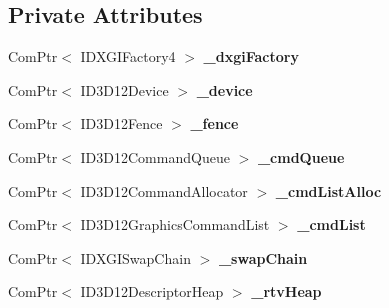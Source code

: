 \subsection*{Private Attributes}
\begin{DoxyCompactItemize}
\item 
Com\+Ptr$<$ I\+D\+X\+G\+I\+Factory4 $>$ {\bfseries \+\_\+dxgi\+Factory}\hypertarget{class_ensum_1_1_graphics_1_1_direct3_d12_a8805759c5176e916d4879643c03493f4}{}\label{class_ensum_1_1_graphics_1_1_direct3_d12_a8805759c5176e916d4879643c03493f4}

\item 
Com\+Ptr$<$ I\+D3\+D12\+Device $>$ {\bfseries \+\_\+device}\hypertarget{class_ensum_1_1_graphics_1_1_direct3_d12_a8e10faf109b0db839652413b7a826899}{}\label{class_ensum_1_1_graphics_1_1_direct3_d12_a8e10faf109b0db839652413b7a826899}

\item 
Com\+Ptr$<$ I\+D3\+D12\+Fence $>$ {\bfseries \+\_\+fence}\hypertarget{class_ensum_1_1_graphics_1_1_direct3_d12_aa0662a390b2af9df9a59123843931180}{}\label{class_ensum_1_1_graphics_1_1_direct3_d12_aa0662a390b2af9df9a59123843931180}

\item 
Com\+Ptr$<$ I\+D3\+D12\+Command\+Queue $>$ {\bfseries \+\_\+cmd\+Queue}\hypertarget{class_ensum_1_1_graphics_1_1_direct3_d12_a264668465ad97536e0989d1aea398194}{}\label{class_ensum_1_1_graphics_1_1_direct3_d12_a264668465ad97536e0989d1aea398194}

\item 
Com\+Ptr$<$ I\+D3\+D12\+Command\+Allocator $>$ {\bfseries \+\_\+cmd\+List\+Alloc}\hypertarget{class_ensum_1_1_graphics_1_1_direct3_d12_a5bdf8937ebc2f6db81372ad6d599463c}{}\label{class_ensum_1_1_graphics_1_1_direct3_d12_a5bdf8937ebc2f6db81372ad6d599463c}

\item 
Com\+Ptr$<$ I\+D3\+D12\+Graphics\+Command\+List $>$ {\bfseries \+\_\+cmd\+List}\hypertarget{class_ensum_1_1_graphics_1_1_direct3_d12_a6cabb16a09e3766e12199b526abf0c10}{}\label{class_ensum_1_1_graphics_1_1_direct3_d12_a6cabb16a09e3766e12199b526abf0c10}

\item 
Com\+Ptr$<$ I\+D\+X\+G\+I\+Swap\+Chain $>$ {\bfseries \+\_\+swap\+Chain}\hypertarget{class_ensum_1_1_graphics_1_1_direct3_d12_a7fc633c1ac1cfbde4d3f2e7b11daf64e}{}\label{class_ensum_1_1_graphics_1_1_direct3_d12_a7fc633c1ac1cfbde4d3f2e7b11daf64e}

\item 
Com\+Ptr$<$ I\+D3\+D12\+Descriptor\+Heap $>$ {\bfseries \+\_\+rtv\+Heap}\hypertarget{class_ensum_1_1_graphics_1_1_direct3_d12_ab05041546dfce3f0e895a1a14c021116}{}\label{class_ensum_1_1_graphics_1_1_direct3_d12_ab05041546dfce3f0e895a1a14c021116}


\end{DoxyCompactItemize}
